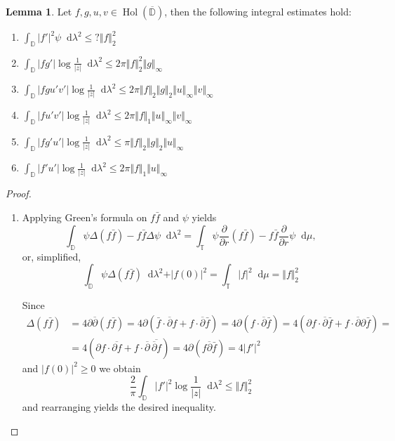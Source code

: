 \documentclass[letterpaper, 11pt]{article}
\newcommand{\D}{\mathbb{D}}
\newcommand{\T}{\mathbb{T}}
\newcommand{\1}{\mathds{1}}
\newcommand{\diff}{\mathop{}\!\mathrm{d}}
\newcommand{\cl}[1]{\overline{#1}}
\newcommand{\wirtzbar}{\overline{\partial}}
\DeclareMathOperator*{\Hol}{Hol}
\theoremstyle{definition}
\newtheorem{lemma}[theorem]{Lemma}
\begin{document}
\begin{lemma}
  Let $f, g, u, v \in \Hol(\cl{\D})$, then the following integral estimates hold:
  \begin{enumerate}
    \item $ \displaystyle \int_\D \vert f' \vert^2 \psi \diff \lambda^2 \leq ? \Vert f \Vert_2^2 $
    \item $ \displaystyle \int_\D \vert f g' \vert \log \frac{1}{\vert z \vert} \diff \lambda^2 \leq 2 \pi \Vert f \Vert_2^2 \Vert g \Vert_\infty $
    \item $ \displaystyle \int_\D \vert f g u' v' \vert \log \frac{1}{\vert z \vert} \diff \lambda^2 \leq 2 \pi \Vert f \Vert_2 \Vert g \Vert_2 \Vert u \Vert_\infty \Vert v \Vert_\infty $
    \item $ \displaystyle \int_\D \vert f u' v' \vert \log \frac{1}{\vert z \vert} \diff \lambda^2 \leq 2 \pi \Vert f \Vert_1 \Vert u \Vert_\infty \Vert v \Vert_\infty $
    \item $ \displaystyle \int_\D \vert f g' u' \vert \log \frac{1}{\vert z \vert} \diff \lambda^2 \leq \pi \Vert f \Vert_2 \Vert g \Vert_2 \Vert u \Vert_\infty $
    \item $ \displaystyle \int_\D \vert f' u' \vert \log \frac{1}{\vert z \vert} \diff \lambda^2 \leq 2 \pi \Vert f \Vert_1 \Vert u \Vert_\infty $
  \end{enumerate}
\end{lemma}

\begin{proof} {\ }
  \begin{enumerate}
    \item Applying Green's formula on $f \bar{f}$ and $\psi$ yields
    $$ \int_\D \psi \Delta (f \bar{f}) - f \bar{f} \Delta \psi \diff \lambda^2 = \int_\T \psi \frac{\partial}{\partial r} (f \bar{f}) - f \bar{f} \frac{\partial}{\partial r} \psi \diff \mu, $$
    or, simplified,
    $$ \int_\D \psi \Delta (f \bar{f}) \diff \lambda^2 + \vert f(0) \vert^2 = \int_\T \vert f \vert^2 \diff \mu = \Vert f \Vert_2^2 $$

    Since
    \begin{align*}
      \Delta(f \bar{f}) &= 4 \partial \wirtzbar (f \bar{f}) = 4 \partial ( \bar{f} \cdot \wirtzbar f + f \cdot \wirtzbar \bar{f} ) = 4 \partial (f \cdot \wirtzbar \bar{f}) = 4 (\partial f \cdot \wirtzbar \bar{f} + f \cdot \wirtzbar \partial \bar{f}) = \\
      &= 4 (\partial f \cdot \overline{\partial f} + f \cdot \wirtzbar \,\overline{ \wirtzbar f }) = 4 \partial ( f \wirtzbar \bar{f} ) = 4 \vert f' \vert^2
    \end{align*}
    and $ \vert f(0) \vert^2 \geq 0$ we obtain
    $$ \frac{2}{\pi} \int_\D \vert f' \vert^2  \log \frac{1}{\vert z \vert} \diff \lambda^2 \leq \Vert f \Vert_2^2 $$
    and rearranging yields the desired inequality.
  \end{enumerate}
\end{proof}
\end{document}
